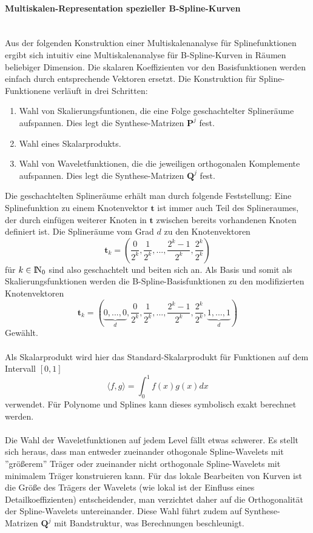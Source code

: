 \documentclass{article}
\newcommand{\N}{{\rm I\!N}}
\begin{document}
\paragraph{Multiskalen-Representation spezieller B-Spline-Kurven}~\\
Aus der folgenden Konstruktion einer Multiskalenanalyse für Splinefunktionen ergibt sich intuitiv eine Multiskalenanalyse für B-Spline-Kurven in Räumen beliebiger Dimension. Die skalaren Koeffizienten vor den  Basisfunktionen werden einfach durch entsprechende Vektoren ersetzt. 
Die Konstruktion für Spline-Funktionene verläuft in drei Schritten: 
\begin{enumerate}
\item Wahl von Skalierungsfuntionen, die eine Folge geschachtelter Splineräume aufspannen. Dies legt die Synthese-Matrizen $\mathbf{P}^j$ fest. 
\item Wahl eines Skalarprodukts. 
\item Wahl von Waveletfunktionen, die die jeweiligen orthogonalen Komplemente aufspannen. Dies legt die Synthese-Matrizen $\mathbf{Q}^j$ fest.
\end{enumerate}
Die geschachtelten Splineräume erhält man durch folgende Feststellung: Eine Splinefunktion zu einem Knotenvektor $\mathbf{t}$ ist immer auch Teil des Splineraumes, der durch einfügen weiterer Knoten in $\mathbf{t}$ zwischen bereits vorhandenen Knoten definiert ist.
Die Splineräume vom Grad $d$ zu den Knotenvektoren
\[
\mathbf{t}_k=(\frac{0}{2^k},\frac{1}{2^k},...,\frac{2^k-1}{2^k},\frac{2^k}{2^k})
\]
für $k\in\N_0$ sind also geschachtelt und beiten sich an. Als Basis und somit als Skalierungsfunktionen werden die B-Spline-Basisfunktionen zu den modifizierten Knotenvektoren
\[
\mathbf{t}_k=(\underbrace{0,...,0}_{d},\frac{0}{2^k},\frac{1}{2^k},...,\frac{2^k-1}{2^k},\frac{2^k}{2^k},\underbrace{1,...,1}_{d})
\]
Gewählt.\\
\\
Als Skalarprodukt wird hier das Standard-Skalarprodukt für Funktionen auf dem Intervall $[0,1]$
\[
\langle f,g\rangle =\int_0^1f(x)g(x)dx
\]
verwendet. Für Polynome und Splines kann dieses symbolisch exakt berechnet werden.\\
\\
Die Wahl der Waveletfunktionen auf jedem Level fällt etwas schwerer. Es stellt sich heraus, dass man entweder zueinander othogonale Spline-Wavelets mit ''größerem'' Träger oder zueinander nicht orthogonale Spline-Wavelets mit minimalem Träger konstruieren kann. Für das lokale Bearbeiten von Kurven ist die Größe des Trägers der Wavelets (wie lokal ist der Einfluss eines Detailkoeffizienten) entscheidender, man verzichtet daher auf die Orthogonalität der Spline-Wavelets untereinander. Diese Wahl führt zudem auf Synthese-Matrizen $\mathbf{Q}^j$ mit Bandstruktur, was Berechnungen beschleunigt.
\end{document}
